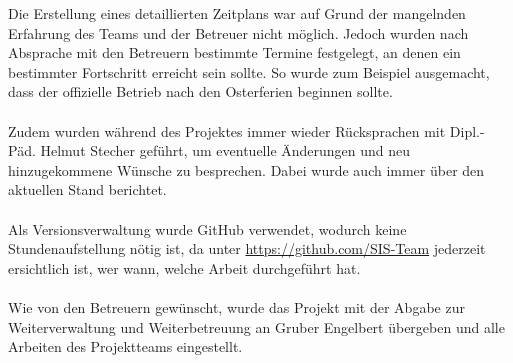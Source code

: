 Die Erstellung eines detaillierten Zeitplans war auf Grund der mangelnden Erfahrung des Teams und der Betreuer nicht möglich. Jedoch wurden nach Absprache mit den Betreuern bestimmte Termine festgelegt, an denen ein bestimmter Fortschritt erreicht sein sollte. So wurde zum Beispiel ausgemacht, dass der offizielle Betrieb nach den Osterferien beginnen sollte.\\\\
Zudem wurden während  des Projektes immer wieder Rücksprachen mit Dipl.-Päd. Helmut Stecher geführt, um eventuelle Änderungen und neu hinzugekommene Wünsche zu besprechen. Dabei wurde auch immer über den aktuellen Stand berichtet.\\\\
Als Versionsverwaltung wurde GitHub verwendet, wodurch keine Stundenaufstellung nötig ist, da unter  \href{https://github.com/SIS-Team}{https://github.com/SIS-Team} jederzeit ersichtlich ist, wer wann, welche Arbeit durchgeführt hat.\\\\
Wie von den Betreuern gewünscht, wurde das Projekt mit der Abgabe zur Weiterverwaltung und Weiterbetreuung an Gruber Engelbert übergeben und alle Arbeiten des Projektteams eingestellt.